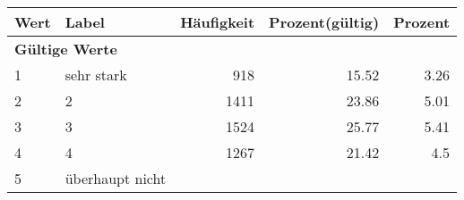      \begin{longtable}{lXrrr}
     \toprule
     \textbf{Wert} & \textbf{Label} & \textbf{Häufigkeit} & \textbf{Prozent(gültig)} & \textbf{Prozent} \\
     \endhead
     \midrule
     \multicolumn{5}{l}{\textbf{Gültige Werte}}\\

     1 &
     \multicolumn{1}{X}{ sehr stark   } &


       \num{918} &
       \num[round-mode=places,round-precision=2]{15.52} &
         \num[round-mode=places,round-precision=2]{3.26} \\

     2 &
     \multicolumn{1}{X}{ 2   } &


       \num{1411} &
       \num[round-mode=places,round-precision=2]{23.86} &
         \num[round-mode=places,round-precision=2]{5.01} \\

     3 &
     \multicolumn{1}{X}{ 3   } &


       \num{1524} &
       \num[round-mode=places,round-precision=2]{25.77} &
         \num[round-mode=places,round-precision=2]{5.41} \\

     4 &
     \multicolumn{1}{X}{ 4   } &


       \num{1267} &
       \num[round-mode=places,round-precision=2]{21.42} &
         \num[round-mode=places,round-precision=2]{4.5} \\

     5 &
     \multicolumn{1}{X}{ überhaupt nicht   } &



\end{longtable}
